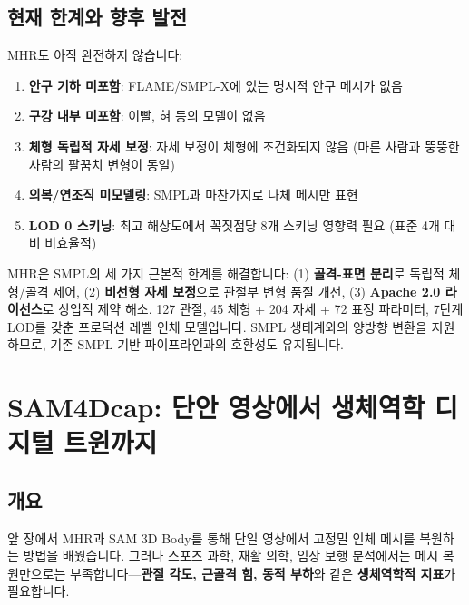 \documentclass[11pt, a4paper]{report}
\begin{document}
\section{현재 한계와 향후 발전}

MHR도 아직 완전하지 않습니다:

\begin{enumerate}[leftmargin=*]
  \item \textbf{안구 기하 미포함}: FLAME/SMPL-X에 있는 명시적 안구 메시가 없음
  \item \textbf{구강 내부 미포함}: 이빨, 혀 등의 모델이 없음
  \item \textbf{체형 독립적 자세 보정}: 자세 보정이 체형에 조건화되지 않음 (마른 사람과 뚱뚱한 사람의 팔꿈치 변형이 동일)
  \item \textbf{의복/연조직 미모델링}: SMPL과 마찬가지로 나체 메시만 표현
  \item \textbf{LOD 0 스키닝}: 최고 해상도에서 꼭짓점당 8개 스키닝 영향력 필요 (표준 4개 대비 비효율적)
\end{enumerate}

\begin{summary}
MHR은 SMPL의 세 가지 근본적 한계를 해결합니다: (1) \textbf{골격-표면 분리}로 독립적 체형/골격 제어, (2) \textbf{비선형 자세 보정}으로 관절부 변형 품질 개선, (3) \textbf{Apache 2.0 라이선스}로 상업적 제약 해소. 127 관절, 45 체형 + 204 자세 + 72 표정 파라미터, 7단계 LOD를 갖춘 프로덕션 레벨 인체 모델입니다. SMPL 생태계와의 양방향 변환을 지원하므로, 기존 SMPL 기반 파이프라인과의 호환성도 유지됩니다.
\end{summary}


\chapter{SAM4Dcap: 단안 영상에서 생체역학 디지털 트윈까지}
\label{ch:sam4dcap}

\section{개요}

앞 장에서 MHR과 SAM 3D Body를 통해 단일 영상에서 고정밀 인체 메시를 복원하는 방법을 배웠습니다. 그러나 스포츠 과학, 재활 의학, 임상 보행 분석에서는 메시 복원만으로는 부족합니다---\textbf{관절 각도, 근골격 힘, 동적 부하}와 같은 \textbf{생체역학적 지표}가 필요합니다.
\end{document}
